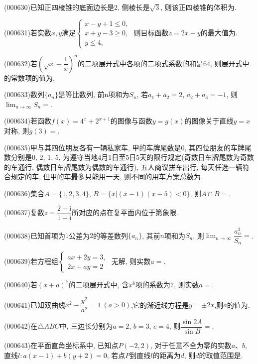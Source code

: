 \item (000630)已知正四棱锥的底面边长是$2$, 侧棱长是$\sqrt3$, 则该正四棱锥的体积为.
\item (000631)若实数$x,y$满足$\begin{cases} x-y+1 \le 0, \\ x+y-3 \ge 0, \\ y\le 4,\end{cases}$ 则目标函数$z=2x-y$的最大值为.
\item (000632)若$(\sqrt x-\dfrac1x)^n$的二项展开式中各项的二项式系数的和是$64$, 则展开式中的常数项的值为.
\item (000633)数列$\{a_n\}$是等比数列, 前n项和为$S_n$, 若$a_1+a_2=2$, $a_2+a_3=-1$, 则$\displaystyle\lim_{n\to\infty}{S_n}=$.
\item (000634)若函数$f(x)=4^x+2^{x+1}$的图像与函数$y=g(x)$的图像关于直线$y=x$对称, 则$g(3)=$.
\item (000635)甲与其四位朋友各有一辆私家车, 甲的车牌尾数是$0$, 其四位朋友的车牌尾数分别是$0$, $2$, $1$, $5$, 为遵守当地4月1日至5日$5$天的限行规定(奇数日车牌尾数为奇数的车通行, 偶数日车牌尾数为偶数的车通行), 五人商议拼车出行, 每天任选一辆符合规定的车, 但甲的车最多只能用一天, 则不同的用车方案总数为.
\item (000636)集合$A=\{1,2,3,4\}$, $B=\{x|(x-1)(x-5)<0\}$, 则$A\cap B=$.
\item (000637)复数$z=\dfrac{2-\mathrm{i}}{1+\mathrm{i}}$所对应的点在复平面内位于第象限.
\item (000638)已知首项为$1$公差为$2$的等差数列$\{a_n\}$, 其前$n$项和为$S_n$, 则$\displaystyle\lim_{n\to\infty}\dfrac{a_n^2}{S_n}=$.
\item (000639)若方程组$\begin{cases} ax+2y=3, \\ 2x+ay=2 \end{cases}$ 无解, 则实数$a=$.
\item (000640)若$(x+a)^7$的二项展开式中, 含$x^6$项的系数为$7$, 则实数$a=$.
\item (000641)已知双曲线$x^2-\dfrac{y^2}{a^2}=1 \ (a>0)$,它的渐近线方程是$y=\pm 2x$,则$a$的值为.
\item (000642)在$\triangle ABC$中, 三边长分别为$a=2$, $b=3$, $c=4$, 则$\dfrac{\sin 2A}{\sin B}=$.
\item (000643)在平面直角坐标系中, 已知点$P(-2,2)$, 对于任意不全为零的实数$a$、$b$, 直线$l:a(x-1)+b(y+2)=0$, 若点$P$到直线$l$的距离为$d$, 则$d$的取值范围是.

